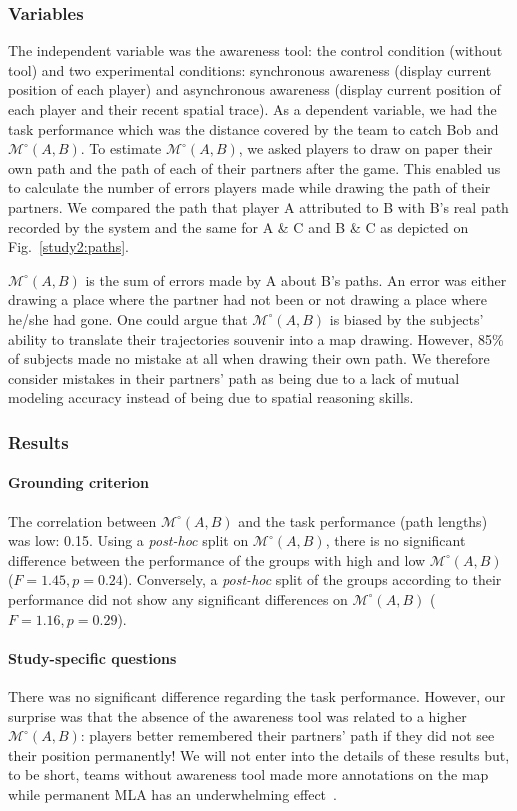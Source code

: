 \documentclass[twocolumn]{article}
\newcommand{\gModel}[2]{{$\mathcal{M}^{\circ}(#1, #2)$}}
\begin{document}
\subsubsection*{Variables}

The independent variable was the awareness tool: the control condition (without
tool) and two experimental conditions: synchronous awareness (display current
position of each player) and asynchronous awareness (display current position of
each player and their recent spatial trace).  As a dependent variable, we had
the task performance which was the distance covered by the team to catch Bob and
\gModel{A}{B}. To estimate \gModel{A}{B}, we asked players to draw on paper
their own path and the path of each of their partners after the game. This
enabled us to calculate the number of errors players made while drawing the path
of their partners. We compared the path that player A attributed to B with B's
real path recorded by the system and the same for A \& C and B \& C as depicted
on Fig.~\ref{study2:paths}. 

\gModel{A}{B} is the sum of errors made by A about B's paths. An error was
either drawing a place where the partner had not been or not drawing a place
where he/she had gone. One could argue that \gModel{A}{B} is biased by the
subjects' ability to translate their trajectories souvenir into a map drawing.
However, 85\% of subjects made no mistake at all when drawing their own path. We
therefore consider mistakes in their partners' path as being due to a lack of
mutual modeling accuracy instead of being due to spatial reasoning skills.

\subsubsection*{Results}

\paragraph{Grounding criterion} The correlation between \gModel{A}{B} and the
task performance (path lengths) was low: 0.15. Using a \emph{post-hoc} split on
\gModel{A}{B}, there is no significant difference between the performance of the
groups with high and low \gModel{A}{B}  ($F = 1.45, p = 0.24$). Conversely, a
\emph{post-hoc} split of the groups according to their performance did not show
any significant differences on \gModel{A}{B} ($F = 1.16, p = 0.29$).

\paragraph{Study-specific questions} There was no significant difference
regarding the task performance. However, our surprise was that the absence of
the awareness tool was related to a higher \gModel{A}{B}: players better
remembered their partners' path if they did not see their position permanently!
We will not enter into the details of these results but, to be short, teams
without awareness tool made more annotations on the map while permanent MLA has
an underwhelming effect~\citep{nova2005location}.
\end{document}
